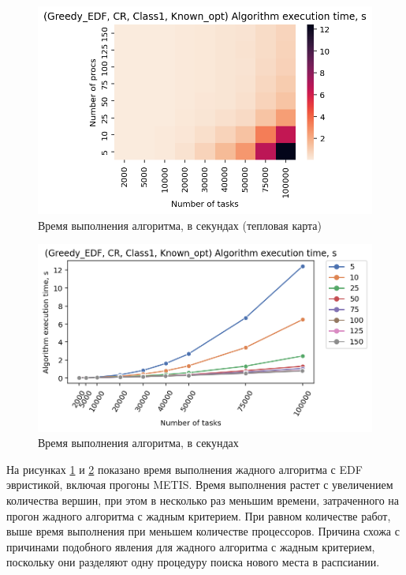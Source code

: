 \begin{figure}[!htbp]
    \centering
    \includegraphics[width=\textwidth]{imgs/ideal_1/CR_EDF/et_heatmap.png}
    \caption{Время выполнения алгоритма, в секундах (тепловая карта)}
    \label{fig:CR-EDF-exec-time-heatmap}
\end{figure}

\begin{figure}[!htbp]
    \centering
    \includegraphics[width=\textwidth]{imgs/ideal_1/CR_EDF/tr_graph.png}
    \caption{Время выполнения алгоритма, в секундах}
    \label{fig:CR-EDF-exec-time-compiled}
\end{figure}

На рисунках \ref{fig:CR-EDF-exec-time-heatmap} и \ref{fig:CR-EDF-exec-time-compiled} показано время выполнения жадного алгоритма с EDF эвристикой, включая прогоны METIS. Время выполнения растет с увеличением количества вершин, при этом в несколько раз меньшим времени, затраченного на прогон жадного алгоритма с жадным критерием. При равном количестве работ, выше время выполнения при меньшем количестве процессоров. Причина схожа с причинами подобного явления для жадного алгоритма с жадным критерием, поскольку они разделяют одну процедуру поиска нового места в распсиании. 

